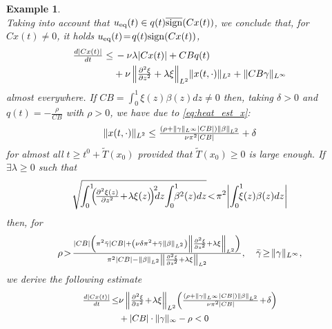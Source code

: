\documentclass{article}
\newcommand{\sign}{\mathrm{sign}}
\newtheorem{example}{Example}
\begin{document}
{\begin{example}
\begin{equation}
 \end{equation}
 Taking into account that  $u_{\rm eq}(t)\in q(t)\overline{\sign}(Cx(t))$, we conclude that, 
 for $Cx(t)\!\neq\! 0$, it holds $u_{\rm eq}(t)\!=\! q(t)\sign(Cx(t))$,  \vspace{-1mm}
 \[
 \begin{split}
\tfrac{d  |Cx(t)|}{dt}\leq&\, -\nu \lambda |Cx(t)|
+CBq(t)\\
&+\nu \left \|\tfrac{\partial^2 \xi}{\partial z^2}+\lambda \xi\right\|_{L^2} \!\|x(t,\cdot)\|_{L^2}+\|CB\gamma\|_{L^{\infty}}
\end{split} \vspace{-1mm}
 \]
 almost everywhere.
If $CB=\int^1_0\xi(z)\beta(z) dz \neq 0$ 
then, taking $\delta>0$ and  $q(t)=-\frac{\rho
}{CB}$ with $\rho>0$,
we have  due to  \eqref{eq:heat_est_x}: \vspace{-1mm}
$$
 \|x(t,\cdot)\|_{L^2}\leq \tfrac{(\rho+\|\gamma\|_{L^{\infty}}|CB|)\|\beta\|_{L^2}}{\nu \pi^2|CB|}+\delta \vspace{-1mm}
$$
for almost all  $t\geq t^0+\tilde T(x_0)$ provided that $\tilde T(x_0)\geq 0$ is large enough.
If $\exists \lambda\geq 0$ such that  \vspace{-1mm}
\begin{equation}\label{eq:cond_lambda}
	\sqrt{\!\int^1_0 \!\!\! \left(\! \tfrac{\partial^2 \xi(z)}{\partial z^2}\!+\!\lambda \xi(z)\!\right)^{\!2} \!\!\!dz \!\int^{1}_0\!\!\!\!\beta^2(z)dz} \!<\! \pi^2\! \left|\int^1_0\!\!\!\!\xi(z)\beta(z) dz\right| \vspace{-1mm}
\end{equation}
then, for  \vspace{-1mm}
\[
\rho\!>\!\tfrac{|CB|\left( \pi^2\bar \gamma |CB|+\left(\nu\delta\pi^2+\bar \gamma\|\beta\|_{L^2}\right)\left \|\frac{\partial^2 \xi}{\partial z^2}+\lambda\xi\right\|_{L^2}\right)}{ \pi^2\left|CB\right|-\|\beta\|_{L^2} \left\|\frac{\partial^2 \xi}{\partial z^2}+\lambda \xi \right\|_{L^2} }, \quad\bar \gamma\!\geq\! \|\gamma\|_{L^{\infty}}, \vspace{-1mm}
\]
we derive the following estimate\vspace{-1mm}
\[\small\vspace{-1mm}
\begin{split}
\tfrac{d  |Cx(t)|}{dt}\!\leq& \nu \left \| \tfrac{\partial^2 \xi}{\partial z^2}\!+\!\lambda \xi\right\|_{L^2}\! \left(\tfrac{(\rho+\|\gamma\|_{L^{\infty}}|CB|)\|\beta\|_{L^2}}{\nu \pi^2|CB|}\!+\!\delta\right) \\
&+|CB|\cdot \|\gamma\|_{\infty}-\rho<0

\end{split}\]
\end{example}}
\end{document}
